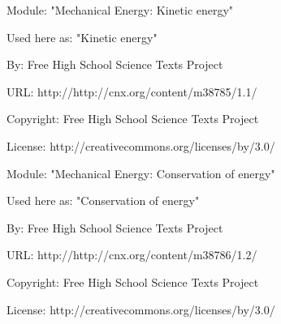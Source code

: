       \par\vspace{9pt}\noindent\begin{minipage}{\textwidth}
      Module: "Mechanical Energy: Kinetic energy" \par\nopagebreak\noindent
      Used here as: "Kinetic energy" \par\nopagebreak\noindent
        By: Free High School Science Texts Project\par\nopagebreak\noindent
      URL: http://http://cnx.org/content/m38785/1.1/\par\nopagebreak\noindent
      \par\nopagebreak\noindent
      Copyright: Free High School Science Texts Project\par\nopagebreak\noindent
      License:  http://creativecommons.org/licenses/by/3.0/\par\nopagebreak\noindent
      \par\end{minipage}
      \par\vspace{9pt}\noindent\begin{minipage}{\textwidth}
      Module: "Mechanical Energy: Conservation of energy" \par\nopagebreak\noindent
      Used here as: "Conservation of energy" \par\nopagebreak\noindent
        By: Free High School Science Texts Project\par\nopagebreak\noindent
      URL: http://http://cnx.org/content/m38786/1.2/\par\nopagebreak\noindent
      \par\nopagebreak\noindent
      Copyright: Free High School Science Texts Project\par\nopagebreak\noindent
      License:  http://creativecommons.org/licenses/by/3.0/\par\nopagebreak\noindent
      \par\end{minipage}

